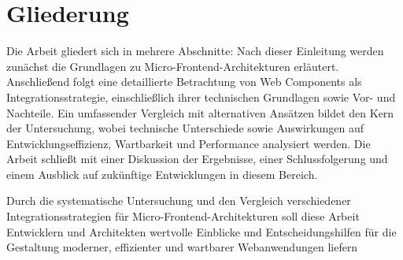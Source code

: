 %
%
\section{Gliederung}
\label{sec:intro:structure}
Die Arbeit gliedert sich in mehrere Abschnitte: Nach dieser Einleitung werden zunächst die Grundlagen zu Micro-Frontend-Architekturen erläutert. Anschließend folgt eine detaillierte Betrachtung von Web Components als Integrationsstrategie, einschließlich ihrer technischen Grundlagen sowie Vor- und Nachteile. Ein umfassender Vergleich mit alternativen Ansätzen bildet den Kern der Untersuchung, wobei technische Unterschiede sowie Auswirkungen auf Entwicklungseffizienz, Wartbarkeit und Performance analysiert werden. Die Arbeit schließt mit einer Diskussion der Ergebnisse, einer Schlussfolgerung und einem Ausblick auf zukünftige Entwicklungen in diesem Bereich.

Durch die systematische Untersuchung und den Vergleich verschiedener Integrationsstrategien für Micro-Frontend-Architekturen soll diese Arbeit Entwicklern und Architekten wertvolle Einblicke und Entscheidungshilfen für die Gestaltung moderner, effizienter und wartbarer Webanwendungen liefern
